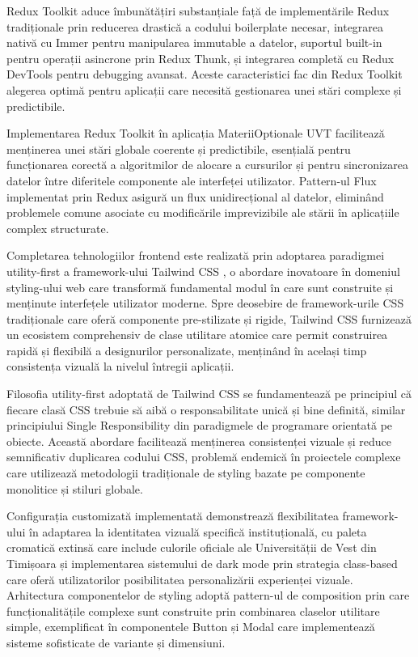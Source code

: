 \documentclass[12pt,a4paper]{report}
\begin{document}
Redux Toolkit aduce îmbunătățiri substanțiale față de implementările Redux tradiționale prin reducerea drastică a codului boilerplate necesar, integrarea nativă cu Immer pentru manipularea immutable a datelor, suportul built-in pentru operații asincrone prin Redux Thunk, și integrarea completă cu Redux DevTools pentru debugging avansat. Aceste caracteristici fac din Redux Toolkit alegerea optimă pentru aplicații care necesită gestionarea unei stări complexe și predictibile.

Implementarea Redux Toolkit în aplicația MateriiOptionale UVT facilitează menținerea unei stări globale coerente și predictibile, esențială pentru funcționarea corectă a algoritmilor de alocare a cursurilor și pentru sincronizarea datelor între diferitele componente ale interfeței utilizator. Pattern-ul Flux implementat prin Redux asigură un flux unidirecțional al datelor, eliminând problemele comune asociate cu modificările imprevizibile ale stării în aplicațiile complex structurate.

Completarea tehnologiilor frontend este realizată prin adoptarea paradigmei utility-first a framework-ului Tailwind CSS \cite{tailwind-css}, o abordare inovatoare în domeniul styling-ului web care transformă fundamental modul în care sunt construite și menținute interfețele utilizator moderne. Spre deosebire de framework-urile CSS tradiționale care oferă componente pre-stilizate și rigide, Tailwind CSS furnizează un ecosistem comprehensiv de clase utilitare atomice care permit construirea rapidă și flexibilă a designurilor personalizate, menținând în același timp consistența vizuală la nivelul întregii aplicații.

Filosofia utility-first adoptată de Tailwind CSS se fundamentează pe principiul că fiecare clasă CSS trebuie să aibă o responsabilitate unică și bine definită, similar principiului Single Responsibility din paradigmele de programare orientată pe obiecte. Această abordare facilitează menținerea consistenței vizuale și reduce semnificativ duplicarea codului CSS, problemă endemică în proiectele complexe care utilizează metodologii tradiționale de styling bazate pe componente monolitice și stiluri globale.

Configurația customizată implementată demonstrează flexibilitatea framework-ului în adaptarea la identitatea vizuală specifică instituțională, cu paleta cromatică extinsă care include culorile oficiale ale Universității de Vest din Timișoara și implementarea sistemului de dark mode prin strategia class-based care oferă utilizatorilor posibilitatea personalizării experienței vizuale. Arhitectura componentelor de styling adoptă pattern-ul de composition prin care funcționalitățile complexe sunt construite prin combinarea claselor utilitare simple, exemplificat în componentele Button și Modal care implementează sisteme sofisticate de variante și dimensiuni.
\end{document}
